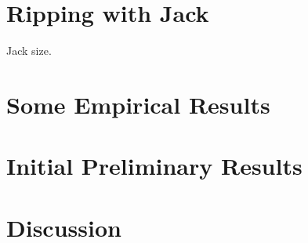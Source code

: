 \documentclass[preprint,10pt,nonatbib]{sigplanconf}
\begin{document}
\section{Ripping with Jack}
\label{section:jack}

Jack size.

\section{Some Empirical Results}
\label{section:look}


\section{Initial Preliminary Results}
\label{section:initial}


\section{Discussion}
\label{section:zz}


\small

\end{document}
